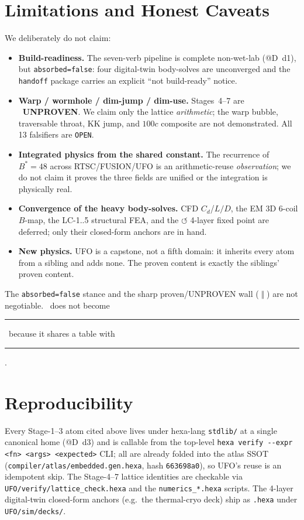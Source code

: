 \documentclass[11pt,a4paper]{article}
\newcommand{\tierdisc}[1]{\textcolor{#1}{\rule[0.05ex]{1.0ex}{1.0ex}}}
\newcommand{\tierdiscopen}{\textcolor{gray!60!black}{\scalebox{0.6}{$\bigcirc$}}}
\newcommand{\tierGreen}{\tierdisc{green!60!black}}
\newcommand{\tierWhite}{\tierdiscopen}
\newcommand{\wall}{\;\big\Vert\;}
\begin{document}
\section{Limitations and Honest Caveats}
\label{sec:limits}

We deliberately do not claim:
\begin{itemize}\itemsep0.2em
\item \textbf{Build-readiness.} The seven-verb pipeline is complete
  non-wet-lab (@D~d1), but \texttt{absorbed=false}: four digital-twin
  body-solves are unconverged and the \texttt{handoff} package carries
  an explicit ``not build-ready'' notice.
\item \textbf{Warp / wormhole / dim-jump / dim-use.} Stages~4--7 are
  \tierWhite\ \textbf{UNPROVEN}. We claim only the lattice
  \emph{arithmetic}; the warp bubble, traversable throat, KK jump, and
  $100c$ composite are not demonstrated. All 13 falsifiers are
  \texttt{OPEN}.
\item \textbf{Integrated physics from the shared constant.} The
  recurrence of $B^{*}=48$ across RTSC/FUSION/UFO is an
  arithmetic-reuse \emph{observation}; we do not claim it proves the
  three fields are unified or the integration is physically real.
\item \textbf{Convergence of the heavy body-solves.} CFD $C_d$/$L/D$,
  the EM 3D 6-coil $B$-map, the LC-1..5 structural FEA, and the
  $\circlearrowleft$ 4-layer fixed point are deferred; only their
  closed-form anchors are in hand.
\item \textbf{New physics.} UFO is a capstone, not a fifth domain: it
  inherits every atom from a sibling and adds none. The proven content
  is exactly the siblings' proven content.
\end{itemize}

\noindent
The \texttt{absorbed=false} stance and the sharp proven/UNPROVEN wall
($\wall$) are not negotiable. \tierWhite\ does not become \tierGreen\
because it shares a table with \tierGreen.

\section{Reproducibility}
\label{sec:repro}

Every Stage-1--3 atom cited above lives under hexa-lang \verb|stdlib/|
at a single canonical home (@D~d3) and is callable from the top-level
\verb|hexa verify --expr <fn> <args> <expected>| CLI; all are already
folded into the atlas SSOT
(\verb|compiler/atlas/embedded.gen.hexa|, hash \texttt{663698a0}), so
UFO's reuse is an idempotent skip. The Stage-4--7 lattice identities are
checkable via \verb|UFO/verify/lattice_check.hexa| and the
\verb|numerics_*.hexa| scripts. The 4-layer digital-twin closed-form
anchors (e.g.\ the thermal-cryo deck) ship as \verb|.hexa| under
\verb|UFO/sim/decks/|.
\end{document}

